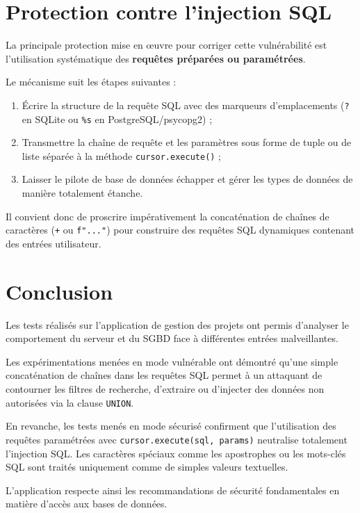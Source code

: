 \documentclass[12pt,a4paper]{article}
\begin{document}
\section{Protection contre l'injection SQL}
La principale protection mise en œuvre pour corriger cette vulnérabilité est l'utilisation systématique des \textbf{requêtes préparées ou paramétrées}.

Le mécanisme suit les étapes suivantes :
\begin{enumerate}
    \item Écrire la structure de la requête SQL avec des marqueurs d'emplacements (\texttt{?} en SQLite ou \texttt{\%s} en PostgreSQL/psycopg2) ;
    \item Transmettre la chaîne de requête et les paramètres sous forme de tuple ou de liste séparée à la méthode \texttt{cursor.execute()} ;
    \item Laisser le pilote de base de données échapper et gérer les types de données de manière totalement étanche.
\end{enumerate}

Il convient donc de proscrire impérativement la concaténation de chaînes de caractères (\texttt{+} ou \texttt{f"..."}) pour construire des requêtes SQL dynamiques contenant des entrées utilisateur.

\section{Conclusion}
Les tests réalisés sur l'application de gestion des projets ont permis d'analyser le comportement du serveur et du SGBD face à différentes entrées malveillantes.

Les expérimentations menées en mode vulnérable ont démontré qu'une simple concaténation de chaînes dans les requêtes SQL permet à un attaquant de contourner les filtres de recherche, d'extraire ou d'injecter des données non autorisées via la clause \texttt{UNION}.

En revanche, les tests menés en mode sécurisé confirment que l'utilisation des requêtes paramétrées avec \texttt{cursor.execute(sql, params)} neutralise totalement l'injection SQL. Les caractères spéciaux comme les apostrophes ou les mots-clés SQL sont traités uniquement comme de simples valeurs textuelles.

L'application respecte ainsi les recommandations de sécurité fondamentales en matière d'accès aux bases de données.
\end{document}
